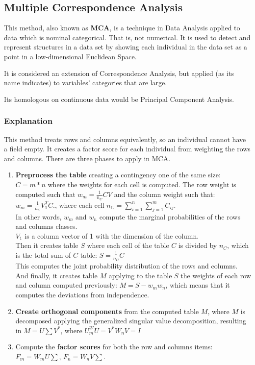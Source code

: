 \newpage
\subsection{Multiple Correspondence Analysis}
This method, also known as \textbf{MCA}, is a technique in Data Analysis applied to data which is nominal categorical. That is, not numerical. It is used to detect and represent structures in a data set by showing each individual in the data set as a point in a low-dimensional Euclidean Space.

It is considered an extension of Correspondence Analysis, but applied (as its name indicates) to variables' categories that are large.

Its homologous on continuous data would be Principal Component Analysis.

\subsubsection{Explanation}
This method treats rows and columns equivalently, so an individual cannot have a field empty. It creates a factor score for each individual from weighting the rows and columns.
There are three phases to apply in MCA.
\begin{enumerate}
  \item \textbf{Preprocess the table} creating a contingency one of the same size: $ C = m *n$ where the weights for each cell is computed. The row weight is computed such that $w_{m} = \frac{1}{n_{C}} CV$ and the column weight such that: $w_{m} = \frac{1}{n_{C}} V^{T}_{1}C$., where each cell $n_{C} = \sum_{i=1}^{n} \sum_{j=1}^{m} C_{ij} $.\\ In other words, $w_{m}$ and $w_{n}$ compute the marginal probabilities of the rows and columns classes.\\

  $V_{1}$ is a column vector of 1 with the dimension of the column. \\
  
  Then it creates table $S$ where each cell of the table $C$ is divided by $n_{C}$, which is the total sum of $C$ table:
 $S = \frac{1}{n_{C}} C$\\
 
 This computes the joint probability distribution of the rows and columns.\\
 
 And finally, it creates table $M$ applying to the table $S$ the weights of each row and column computed previously:
 $M = S - w_{m}w_{n}$, which means that it computes the deviations from independence.
 
  \item  \textbf{Create orthogonal components} from the computed table $M$, where $M$ is decomposed applying the generalized singular value decomposition, resulting in $M = U\sum V^*$, where $U^W_{m}U = V^{*}W_{n}V = I$
  \item Compute the \textbf{factor scores} for both the row and columns items:
  $F_{m} = W_{m}U\sum$, $F_{n} = W_{n}V\sum$.
  
\end{enumerate}

